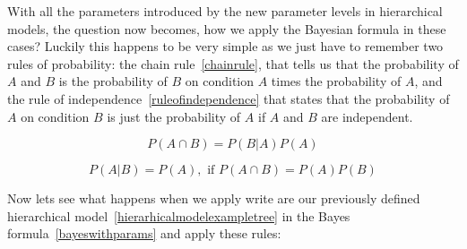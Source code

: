 \documentclass[12pt,a4paper,leqno]{report}
\theoremstyle{plain}
\theoremstyle{definition}
\theoremstyle{remark}
\begin{document}
With all the parameters introduced by the new parameter levels in hierarchical models,
the question now becomes, how we apply
the Bayesian formula in these cases? Luckily this happens to be very simple as we just
have to remember two rules of probability: the chain rule\ \ref{chainrule}, that
tells us that the probability of \(A\) and \(B\) is the probability of \(B\) on condition \(A\)
times the probability of \(A\), and the rule of independence\ \ref{ruleofindependence}
that states that the
probability of \(A\) on condition \(B\) is just the probability of \(A\) if \(A\) and
\(B\) are independent.

\begin{equation}\label{chainrule}
    P(A \cap B) = P(B|A)P(A)
\end{equation}

\begin{equation}\label{ruleofindependence}
    P(A|B) = P(A), \text{ if } P(A \cap B) = P(A)P(B)
\end{equation}
\smallskip

Now lets see what happens when we apply write are our previously defined hierarchical
model\ \ref{hierarhicalmodelexampletree} in the Bayes formula\
\ref{bayeswithparams} and apply these rules:
\end{document}
